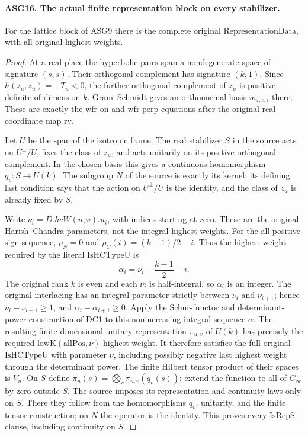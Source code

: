 \paragraph{ASG16. The actual finite representation block on every stabilizer.}
\label{claim:ASG16}
For the lattice block of ASG9 there is the complete original
\(\mathrm{RepresentationData}\), with all original highest weights.
\begin{proof}
At a real place the hyperbolic pairs span a nondegenerate space of
signature \((s,s)\).  Their orthogonal complement has signature
\((k,1)\).  Since \(h(z_u,z_u)=-T_u<0\), the further
orthogonal complement of \(z_u\) is positive definite of dimension
\(k\).  Gram--Schmidt gives an orthonormal basis \(w_{u,v,i}\)
there.  These are exactly the \(\mathrm{wfr\_on}\) and
\(\mathrm{wfr\_perp}\) equations after the original real
coordinate map \(\mathrm{rv}\).

Let \(U\) be the span of the isotropic frame.  The real stabilizer
\(S\) in the source acts on \(U^\perp/U\), fixes the class
of \(z_u\), and acts unitarily on its positive orthogonal
complement.  In the chosen basis this gives a continuous homomorphism
\(q_v:S\to U(k)\).  The subgroup \(N\) of the source is
exactly its kernel: its defining last condition says that the action
on \(U^\perp/U\) is the identity, and the class of \(z_u\)
is already fixed by \(S\).

Write \(\nu_i=D.hcW(u,v).u_i\), with indices starting at zero.
These are the original Harish--Chandra parameters, not the integral
highest weights.  For the all-positive sign sequence,
\(\rho_N=0\) and \(\rho_C(i)=(k-1)/2-i\).  Thus the
highest weight required by the literal \(\mathrm{IsHCTypeU}\) is
\[
       \alpha_i=\nu_i-\frac{k-1}{2}+i.
\]
The original rank \(k\) is even and each \(\nu_i\) is
half-integral, so \(\alpha_i\) is an integer.  The original
interlacing has an integral parameter strictly between
\(\nu_i\) and \(\nu_{i+1}\); hence
\(\nu_i-\nu_{i+1}\ge1\), and
\(\alpha_i-\alpha_{i+1}\ge0\).
Apply the Schur-functor and determinant-power construction of DC1
to this nonincreasing integral sequence \(\alpha\).
The resulting finite-dimensional unitary representation
\(\pi_{u,v}\) of \(U(k)\) has precisely the required
\(\mathrm{lowK}(\mathrm{allPos},\nu)\) highest weight.
It therefore satisfies the full original
\(\mathrm{IsHCTypeU}\) with parameter \(\nu\), including
possibly negative last highest weight through the determinant power.
The finite Hilbert tensor product of their spaces is \(V_u\).
On \(S\) define \(\pi_u(s)=\bigotimes_v\pi_{u,v}(q_v(s))\);
extend the function to all of \(G_\infty\) by zero outside \(S\).
The source imposes its representation and continuity laws only on
\(S\).  There they follow from the homomorphisms \(q_v\),
unitarity, and the finite tensor construction; on \(N\) the
operator is the identity.  This proves every \(\mathrm{IsRepS}\)
clause, including continuity on \(S\).


\end{proof}
